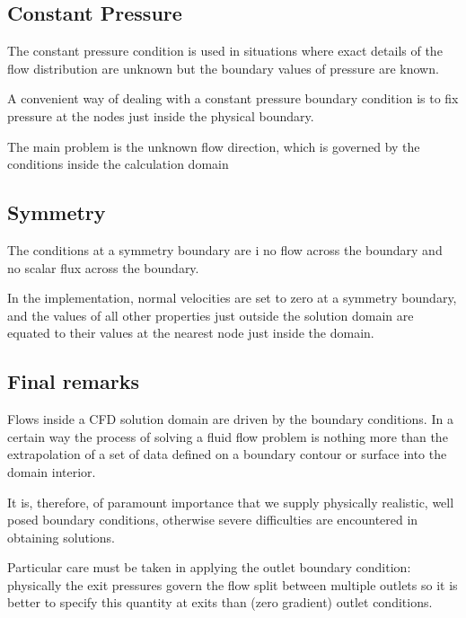\documentclass[a4paper, 15pt]{article}
\begin{document}
\subsection*{Constant Pressure}
The
constant pressure condition is used in situations where exact details of the flow distribution
are unknown but the boundary values of pressure are known. \newline 

A
convenient way of dealing with a constant pressure boundary condition is to fix pressure at the
nodes just inside the physical boundary. \newline

The
main problem is the unknown flow direction, which is governed by the conditions inside the
calculation domain

\subsection*{Symmetry}

The
conditions at a symmetry boundary are i no flow across the boundary and no scalar flux
across the boundary. \newline 

In
the implementation, normal velocities are set to zero at a symmetry boundary, and the values
of all other properties just outside the solution domain are equated to their values
at the nearest node just inside the domain. 

\subsection*{Final remarks}
Flows
inside a CFD solution domain are driven by the boundary conditions. In a certain way the process
of solving a fluid flow problem is nothing more than the extrapolation of a set of data defined on
a boundary contour or surface into the domain interior. 

It
is, therefore, of paramount importance that we supply physically realistic, well posed
boundary conditions, otherwise severe difficulties are encountered in obtaining solutions. \newline 

Particular
care must be taken in applying the outlet boundary condition: physically
the exit pressures govern the flow split between multiple outlets so it is better to
specify this quantity at exits than (zero gradient) outlet conditions. \newline 
\end{document}
